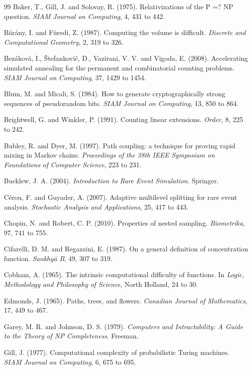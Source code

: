 \documentclass[11pt,twoside,openany]{book}
\theoremstyle{plain}
\theoremstyle{definition}
\theoremstyle{remark}
\begin{document}
\begin{thebibliography}{99}
 Baker, T., Gill, J. and Solovay, R. (1975). Relativizations of the P =? NP question. \emph{SIAM Journal on Computing}, 4, 431 to 442.

 B\'ar\'any, I. and F\"uredi, Z. (1987). Computing the volume is difficult. \emph{Discrete and Computational Geometry}, 2, 319 to 326.

 Bez\'akov\'a, I., \v{S}tefankovi\v{c}, D., Vazirani, V. V. and Vigoda, E. (2008). Accelerating simulated annealing for the permanent and combinatorial counting problems. \emph{SIAM Journal on Computing}, 37, 1429 to 1454.

 Blum, M. and Micali, S. (1984). How to generate cryptographically strong sequences of pseudorandom bits. \emph{SIAM Journal on Computing}, 13, 850 to 864.

 Brightwell, G. and Winkler, P. (1991). Counting linear extensions. \emph{Order}, 8, 225 to 242.

 Bubley, R. and Dyer, M. (1997). Path coupling: a technique for proving rapid mixing in Markov chains. \emph{Proceedings of the 38th IEEE Symposium on Foundations of Computer Science}, 223 to 231.

 Bucklew, J. A. (2004). \emph{Introduction to Rare Event Simulation}. Springer.

 C\'erou, F. and Guyader, A. (2007). Adaptive multilevel splitting for rare event analysis. \emph{Stochastic Analysis and Applications}, 25, 417 to 443.

 Chopin, N. and Robert, C. P. (2010). Properties of nested sampling. \emph{Biometrika}, 97, 741 to 755.

 Cifarelli, D. M. and Regazzini, E. (1987). On a general definition of concentration function. \emph{Sankhy\=a B}, 49, 307 to 319.

 Cobham, A. (1965). The intrinsic computational difficulty of functions. In \emph{Logic, Methodology and Philosophy of Science}, North Holland, 24 to 30.

 Edmonds, J. (1965). Paths, trees, and flowers. \emph{Canadian Journal of Mathematics}, 17, 449 to 467.

 Garey, M. R. and Johnson, D. S. (1979). \emph{Computers and Intractability: A Guide to the Theory of NP Completeness}. Freeman.

 Gill, J. (1977). Computational complexity of probabilistic Turing machines. \emph{SIAM Journal on Computing}, 6, 675 to 695.


\end{thebibliography}
\end{document}
